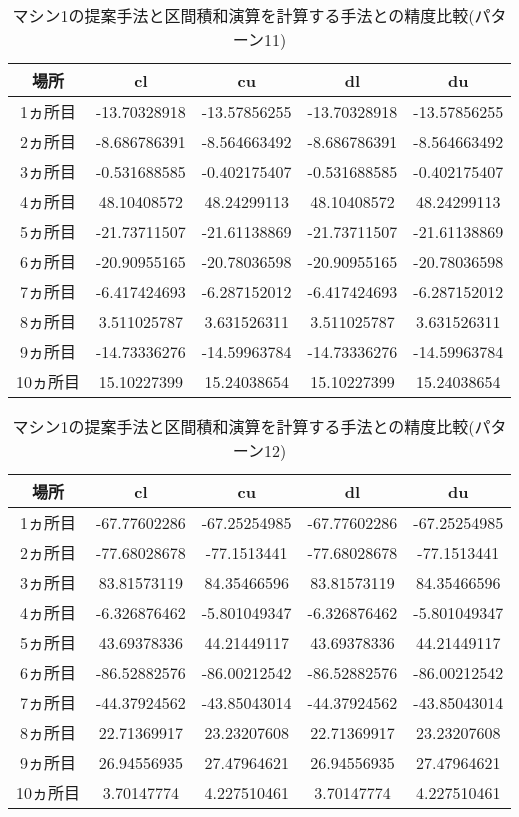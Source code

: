 \documentclass[11pt,a4paper]{jsreport}
\theoremstyle{definition}
\begin{document}
\begin{table}[H]
\centering
\begin{tabular}{|c|c|c|c|c|}
\hline
場所 & cl & cu & dl & du \\ \hline
1ヵ所目 & -13.70328918 & -13.57856255 & -13.70328918 & -13.57856255 \\ \hline
2ヵ所目 & -8.686786391 & -8.564663492 & -8.686786391 & -8.564663492 \\ \hline
3ヵ所目 & -0.531688585 & -0.402175407 & -0.531688585 & -0.402175407 \\ \hline
4ヵ所目 & 48.10408572 & 48.24299113 & 48.10408572 & 48.24299113 \\ \hline
5ヵ所目 & -21.73711507 & -21.61138869 & -21.73711507 & -21.61138869 \\ \hline
6ヵ所目 & -20.90955165 & -20.78036598 & -20.90955165 & -20.78036598 \\ \hline
7ヵ所目 & -6.417424693 & -6.287152012 & -6.417424693 & -6.287152012 \\ \hline
8ヵ所目 & 3.511025787 & 3.631526311 & 3.511025787 & 3.631526311 \\ \hline
9ヵ所目 & -14.73336276 & -14.59963784 & -14.73336276 & -14.59963784 \\ \hline
10ヵ所目 & 15.10227399 & 15.24038654 & 15.10227399 & 15.24038654 \\ \hline
\end{tabular}
\caption{マシン1の提案手法と区間積和演算を計算する手法との精度比較(パターン11)}
\end{table}

\begin{table}[H]
\centering
\begin{tabular}{|c|c|c|c|c|}
\hline
場所 & cl & cu & dl & du \\ \hline
1ヵ所目 & -67.77602286 & -67.25254985 & -67.77602286 & -67.25254985 \\ \hline
2ヵ所目 & -77.68028678 & -77.1513441 & -77.68028678 & -77.1513441 \\ \hline
3ヵ所目 & 83.81573119 & 84.35466596 & 83.81573119 & 84.35466596 \\ \hline
4ヵ所目 & -6.326876462 & -5.801049347 & -6.326876462 & -5.801049347 \\ \hline
5ヵ所目 & 43.69378336 & 44.21449117 & 43.69378336 & 44.21449117 \\ \hline
6ヵ所目 & -86.52882576 & -86.00212542 & -86.52882576 & -86.00212542 \\ \hline
7ヵ所目 & -44.37924562 & -43.85043014 & -44.37924562 & -43.85043014 \\ \hline
8ヵ所目 & 22.71369917 & 23.23207608 & 22.71369917 & 23.23207608 \\ \hline
9ヵ所目 & 26.94556935 & 27.47964621 & 26.94556935 & 27.47964621 \\ \hline
10ヵ所目 & 3.70147774 & 4.227510461 & 3.70147774 & 4.227510461 \\ \hline
\end{tabular}
\caption{マシン1の提案手法と区間積和演算を計算する手法との精度比較(パターン12)}
\end{table}
\end{document}
